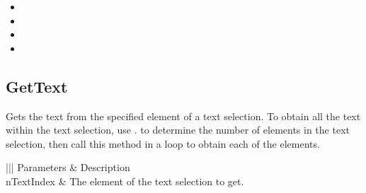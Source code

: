 \documentclass[letterpaper,12pt,english,openany,oneside]{sphinxmanual}
\begin{document}
\begin{itemize}
\item {} 
 

\item {} 
 

\item {} 
 

\item {} 
 

\end{itemize}




\subsection{GetText}
\label{\detokenize{IAC_API_OLE_Objects:gettext}}
Gets the text from the specified element of a text selection. To obtain all the text within the text selection, use .  to determine the number of elements in the text selection, then call this method in a loop to obtain each of the elements.


\begin{sphinxVerbatim}[commandchars=\\\{\}]
  
\end{sphinxVerbatim}
\label{\detokenize{IAC_API_OLE_Objects:parameters-79}}


\begin{savenotes}\sphinxattablestart
\centering
{}\label{\detokenize{IAC_API_OLE_Objects:section-89}}\nobreak
\begin{tabular}[t]{|||}
\hline
\sphinxstyletheadfamily 
Parameters
&\sphinxstyletheadfamily 
Description
\\
\hline
nTextIndex
&
The element of the text selection to get.
\\
\hline
\end{tabular}
\par
\sphinxattableend\end{savenotes}
\end{document}
